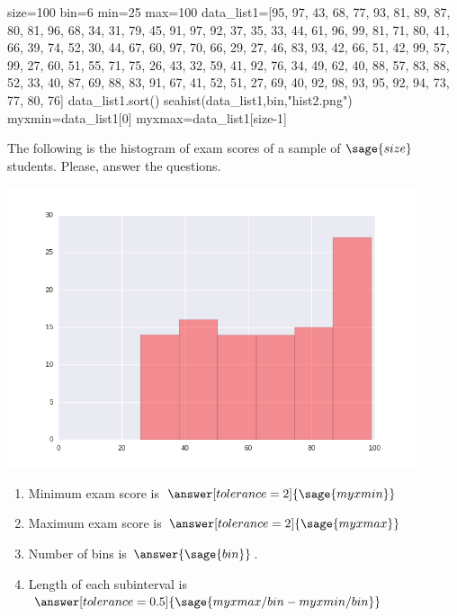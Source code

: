 \documentclass{ximera}
\begin{document}
\begin{problem}
\begin{sagesilent}
size=100
bin=6
min=25
max=100
data_list1=[95, 97, 43, 68, 77, 93, 81, 89, 87, 80, 81, 96, 68, 34, 31, 79, 45, 91, 97, 92, 37, 35, 33, 44, 61, 96, 99, 81, 71, 80, 41, 66, 39, 74, 52, 30, 44, 67, 60, 97, 70, 66, 29, 27, 46, 83, 93, 42, 66, 51, 42, 99, 57, 99, 27, 60, 51, 55, 71, 75, 26, 43, 32, 59, 41, 92, 76, 34, 49, 62, 40, 88, 57, 83, 88, 52, 33, 40, 87, 69, 88, 83, 91, 67, 41, 52, 51, 27, 69, 40, 92, 98, 93, 95, 92, 94, 73, 77, 80, 76]
data_list1.sort()    
seahist(data_list1,bin,"hist2.png")
myxmin=data_list1[0]
myxmax=data_list1[size-1]
\end{sagesilent}

The following is the histogram of exam scores of a sample of $\sage{size}$ students. Please, answer the questions.


\includegraphics[width=12cm]{hist2.png}

\begin{enumerate}
    \item Minimum exam score is $\answer[tolerance=2]{\sage{myxmin}}$
    \item Maximum exam score is $\answer[tolerance=2]{\sage{myxmax}}$
    \item Number of bins is $\answer{\sage{bin}}$.
    \item Length of each subinterval is $\answer[tolerance=0.5]{\sage{myxmax/bin-myxmin/bin}}$
\end{enumerate}
\end{problem}
\end{document}

